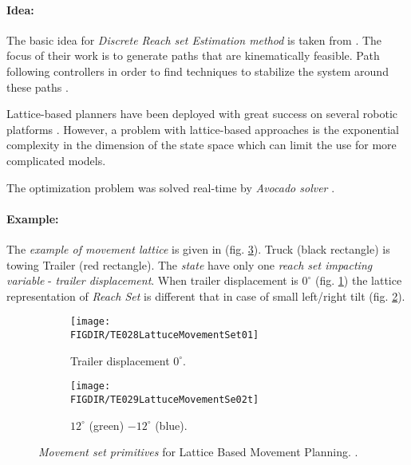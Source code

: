 \paragraph{Idea:} The basic idea for \emph{Discrete Reach set Estimation  method} is taken from \cite{ljungqvist2017lattice}. The focus of their work is to generate paths that are kinematically feasible. Path following controllers in order to find techniques to stabilize the system around these paths \cite{ljungqvist2016path,evestedt2016path}. 

Lattice-based planners have been deployed with great success on several robotic platforms \cite{pivtoraiko2009differentially,urmson2008william,cirillo2017videogames}. However, a problem with lattice-based approaches is the exponential complexity in the dimension of the state space which can limit the use for more complicated models.

The optimization problem was solved real-time by \emph{Avocado solver} \cite{houska2011acado}.

\paragraph{Example:} The \emph{example of movement lattice} is given in (fig. \ref{fig:latticeMovementPrimitivesExample}). Truck (black rectangle) is towing Trailer (red rectangle). The \emph{state} have only one \emph{reach set impacting variable} - \emph{trailer displacement}. When trailer displacement is $0^{\circ}$ (fig. \ref{fig:noDisplacementLattuce}) the lattice representation of \emph{Reach Set} is different that in case of small left/right tilt (fig. \ref{fig:displacementleftrightlattuce}).

\begin{figure}[H]
    \centering
    \begin{subfigure}{0.48\textwidth}
        \centering
        \texttt{[image: \\FIGDIR/TE028LattuceMovementSet01]}
        \caption{Trailer displacement $0^{\circ}$.}
        \label{fig:noDisplacementLattuce}
    \end{subfigure}
    \begin{subfigure}{0.48\textwidth}
        \centering
        \texttt{[image: \\FIGDIR/TE029LattuceMovementSe02t]} 
        \caption{$12^{\circ}$ (green) $-12^{\circ}$ (blue).}
        \label{fig:displacementleftrightlattuce}
    \end{subfigure}
    
    \caption{\emph{Movement set primitives} for Lattice Based Movement Planning. \cite{ljungqvist2017lattice}. }
    \label{fig:latticeMovementPrimitivesExample}
\end{figure}

